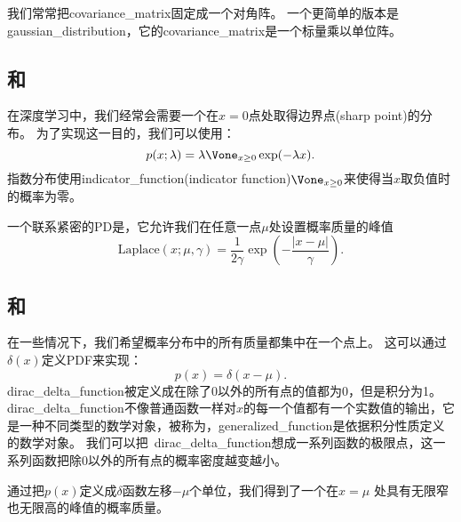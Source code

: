 
我们常常把\gls{covariance_matrix}固定成一个对角阵。
一个更简单的版本是\gls{gaussian_distribution}，它的\gls{covariance_matrix}是一个标量乘以单位阵。

\subsection{和}
\label{sec:exponential_and_laplace_distributions}

在深度学习中，我们经常会需要一个在$x=0$点处取得边界点(sharp point)的分布。
为了实现这一目的，我们可以使用：
\begin{equation}
p(x; \lambda) = \lambda \Vone_{x\ge 0} \exp(-\lambda x).
\end{equation}
指数分布使用\gls{indicator_function}(indicator function)$\Vone_{x\ge 0}$来使得当$x$取负值时的概率为零。

一个联系紧密的\gls{PD}是，它允许我们在任意一点$\mu$处设置概率质量的峰值
\begin{equation}
\label{eq:chap3_laplace}
\text{Laplace}(x; \mu, \gamma) = \frac{1}{2\gamma} \exp \left( -\frac{|x-\mu|}{\gamma}  \right).
\end{equation}

\subsection{和}
\label{sec:the_dirac_distribution_and_empirical_distribution}

在一些情况下，我们希望概率分布中的所有质量都集中在一个点上。
这可以通过 $\delta(x)$定义\gls{PDF}来实现：
\begin{equation}
p(x) = \delta(x-\mu).
\end{equation}
\gls{dirac_delta_function}被定义成在除了0以外的所有点的值都为0，但是积分为1。
\gls{dirac_delta_function}不像普通函数一样对$x$的每一个值都有一个实数值的输出，它是一种不同类型的数学对象，被称为，\gls{generalized_function}是依据积分性质定义的数学对象。
我们可以把~\gls{dirac_delta_function}想成一系列函数的极限点，这一系列函数把除0以外的所有点的概率密度越变越小。


通过把$p(x)$定义成$\delta$函数左移$-\mu$个单位，我们得到了一个在$x=\mu$ 处具有无限窄也无限高的峰值的概率质量。

